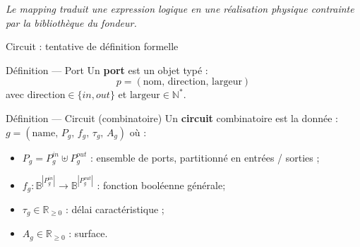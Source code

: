 \begin{frame}
\vfill
\begin{center}
\footnotesize\itshape
Le mapping traduit une expression logique en une réalisation physique contrainte par la bibliothèque du fondeur.
\end{center}

\end{frame}

\begin{frame}{Circuit : tentative de définition formelle}

    \begin{block}{Définition — Port}
        Un \textbf{port} est un objet typé :
        \[
            p = (\text{nom},\, \text{direction},\, \text{largeur})
        \]
        avec \(\text{direction} \in \{in, out\}\) et \(\text{largeur} \in \mathbb{N}^*\).
    \end{block}

    \vspace{0.2cm}

    \begin{block}{Définition — Circuit (combinatoire)}
        Un \textbf{circuit} combinatoire est la donnée : $g = (\text{name},\, P_g,\, f_g,\, \tau_g,\, A_g)$
        où :
        \begin{itemize}
            \item \(P_g = P_g^{in} \uplus P_g^{out}\) : ensemble de ports, partitionné en entrées / sorties ;
            \item \(f_g : \mathbb{B}^{|P_g^{in}|} \to \mathbb{B}^{|P_g^{out}|}\) : fonction booléenne générale;
            \item \(\tau_g \in \mathbb{R}_{\geq 0}\) : délai caractéristique ;
            \item \(A_g \in \mathbb{R}_{\geq 0}\) : surface.
        \end{itemize}
    \end{block}


\end{frame}
